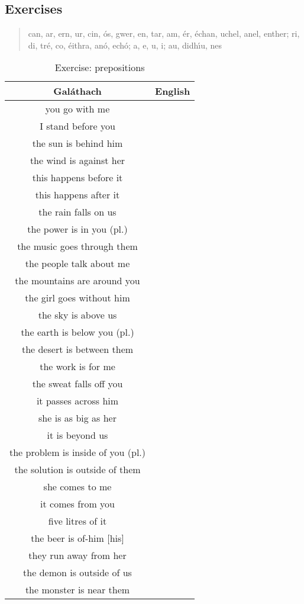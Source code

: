 \newpage
\subsection{Exercises}

\begin{quote}
can, ar, ern, ur, cin, \'{o}s, gwer, en, tar, am, \'{e}r, \'{e}chan, uchel, anel, enther; ri, di, tr\'{e}, co, \'{e}ithra, an\'{o}, ech\'{o}; a, e, u, i; au, didh\'{\i}u, nes
\end{quote}

\begin{table}[H]
\centering
\begin{tabular}{|c|M{5.0cm}|}
  \toprule
  \textbf{Gal\'{a}thach} & \textbf{English}\\
  \toprule
  you go with me & \\
  \midrule
  I stand before you & \\
  \midrule
  the sun is behind him & \\
  \midrule
  the wind is against her & \\
  \midrule
  this happens before it & \\
  \midrule
  this happens after it & \\
  \midrule
  the rain falls on us & \\
  \midrule
  the power is in you (pl.) & \\
  \midrule
  the music goes through them & \\
  \midrule
  the people talk about me & \\
  \midrule
  the mountains are around you & \\
  \midrule
  the girl goes without him & \\
  \midrule
  the sky is above us & \\
  \midrule
  the earth is below you (pl.) & \\
  \midrule
  the desert is between them & \\
  \midrule
  the work is for me & \\
  \midrule
  the sweat falls off you & \\
  \midrule
  it passes across him & \\
  \midrule
  she is as big as her & \\
  \midrule
  it is beyond us & \\
  \midrule
  the problem is inside of you (pl.) & \\
  \midrule
  the solution is outside of them & \\
  \midrule
  she comes to me & \\
  \midrule
  it comes from you & \\
  \midrule
  five litres of it & \\
  \midrule
  the beer is of-him $[$his$]$ & \\
  \midrule
  they run away from her & \\
  \midrule
  the demon is outside of us & \\
  \midrule
  the monster is near them & \\
  \bottomrule
\end{tabular}
\label{exercise_prepositions}
\caption{Exercise: prepositions}
\end{table}

